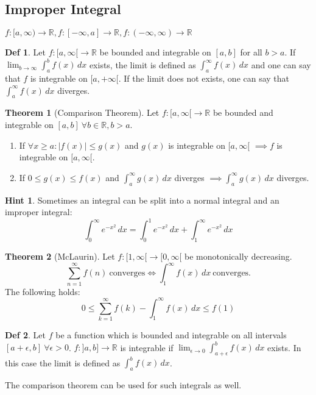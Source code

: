 \documentclass[a4paper, 10pt]{article}
\theoremstyle{definition}
\newtheorem*{definition}{Def}
\newtheorem*{note_wrapper}{Hint}
\theoremstyle{named}
\newtheorem*{ntheorem_wrapper}{Theorem}
\newenvironment{ntheorem}%
    {\begin{mdframed}[style=important]\begin{ntheorem_wrapper}}%
    {\end{ntheorem_wrapper}\end{mdframed}}
\newenvironment{note}%
    {\begin{mdframed}[style=trick]\begin{note_wrapper}}%
    {\end{note_wrapper}\end{mdframed}}
\newcommand{\R}{\mathbb{R}}
\begin{document}
\subsection{Improper Integral}
\begin{center}
    $f: [a, \infty) \to \R, f: [-\infty, a] \to \R, f: (-\infty, \infty) \to \R$
\end{center}

\begin{definition}
    Let $f: [a, \infty[ \to \R$ be bounded and integrable on $[a, b]$ for all $b > a$. If $\lim_{b \to \infty} \int_a^b f(x) \,dx$ exists, the limit is defined as $\int_a^\infty f(x) \,dx$ and one can say that $f$ is integrable on $[a, +\infty[$. If the limit does not exists, one can say that $\int_a^\infty f(x) \,dx$ diverges.
\end{definition}

\begin{ntheorem}[Comparison Theorem]
    Let $f: [a, \infty[ \to \R$ be bounded and integrable on $[a, b] \ \forall b \in \R, b > a$.
    \begin{enumerate}
        \item If $\forall x \geq a : |f(x)| \leq g(x)$ and $g(x)$ is integrable on $[a, \infty[$ $\implies f$ is integrable on $[a, \infty[$.
        \item If $0 \leq g(x) \leq f(x)$ and $\int_a^\infty g(x) \,dx$ diverges $\implies \int_a^\infty g(x) \,dx$ diverges.
    \end{enumerate}
\end{ntheorem}

\begin{note}
    Sometimes an integral can be split into a normal integral and an improper integral:
    $$\int_0^\infty e^{-x^2} \,dx = \int_0^1 e^{-x^2} \,dx + \int_1^\infty e^{-x^2} \,dx$$
\end{note}

\begin{ntheorem}[McLaurin]
    Let $f: [1, \infty[ \to [0, \infty[$ be monotonically decreasing.
    $$\sum_{n=1}^\infty f(n) \ \text{converges} \iff \int_1^\infty f(x) \,dx \ \text{converges}.$$ 
    The following holds:
    $$0 \leq \sum_{k=1}^\infty f(k) - \int_1^\infty f(x) \,dx \leq f(1)$$
\end{ntheorem}

\begin{definition}
    Let $f$ be a function which is bounded and integrable on all intervals $[a + \epsilon, b] \ \forall \epsilon > 0$. $f: ]a, b] \to \R$ is integrable if $\lim_{\epsilon \to 0} \int_{a + \epsilon}^b f(x) \,dx$ exists. In this case the limit is defined as $\int_a^b f(x) \,dx$.
\end{definition}
The comparison theorem can be used for such integrals as well.
\end{document}
